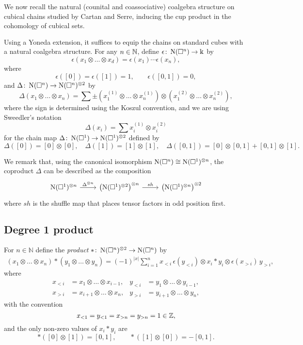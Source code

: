We now recall the natural (counital and coassociative) coalgebra structure on cubical chains studied by Cartan and Serre, inducing the cup product in the cohomology of cubical sets.

Using a Yoneda extension, it suffices to equip the chains on standard cubes with a natural coalgebra structure.
For any $n \in \mathbb{N}$, define $\epsilon \colon \operatorname{N}(\square^n) \to \Bbbk$ by
\[
\epsilon \left( x_1 \otimes \dots \otimes x_d \right) = \epsilon(x_1) \dotsm \epsilon(x_n),
\]
where
\[
\epsilon([0]) = \epsilon([1]) = 1, \qquad \epsilon([0, 1]) = 0,
\]
and $\Delta \colon \operatorname{N}(\square^n) \to \operatorname{N}(\square^n)^{\otimes 2}$ by
\[
\Delta (x_1 \otimes \dots \otimes x_n) =
\sum \pm \left( x_1^{(1)} \otimes \dots \otimes x_n^{(1)} \right) \otimes
\left( x_1^{(2)} \otimes \dots \otimes x_n^{(2)} \right),
\]
where the sign is determined using the Koszul convention, and we are using Sweedler's notation
\[
\Delta(x_i) = \sum x_i^{(1)} \otimes x_i^{(2)}
\]
for the chain map $\Delta \colon \operatorname{N}(\square^1) \to \operatorname{N}(\square^1)^{\otimes 2}$ defined by
\[
\Delta([0]) = [0] \otimes [0], \quad \Delta([1]) = [1] \otimes [1], \quad \Delta([0,1]) = [0] \otimes [0,1] + [0,1] \otimes [1].
\]

We remark that, using the canonical isomorphism $\operatorname{N}(\square^n) \cong \operatorname{N}(\square^1)^{\otimes n}$, the coproduct $\Delta$ can be described as the composition
\[
\begin{tikzcd}
\chains(\cube^1)^{\otimes n} \arrow[r, "\Delta^{\otimes n}"] & \left( \chains(\cube^1)^{\otimes 2} \right)^{\otimes n} \arrow[r, "sh"] & \left( \chains(\cube^1)^{\otimes n} \right)^{\otimes 2}
\end{tikzcd}
\]
where $sh$ is the shuffle map that places tensor factors in odd position first.

\subsection{Degree 1 product}

For $n \in \mathbb{N}$ define the \textit{product} $\ast  \colon \operatorname{N}(\square^n)^{\otimes 2} \to \operatorname{N}(\square^n)$ by
\begin{align*}
(x_1 \otimes \dots \otimes x_n) \ast (y_1 \otimes \dots \otimes y_n) =
(-1)^{|x|} \sum_{i=1}^n x_{<i}\, \epsilon(y_{<i}) \otimes x_i \ast y_i \otimes \epsilon(x_{>i}) \, y_{>i},
\end{align*}
where
\begin{align*}
x_{<i} & = x_1 \otimes \dots \otimes x_{i-1}, &
y_{<i} & = y_1 \otimes \dots \otimes y_{i-1}, \\
x_{>i} & = x_{i+1} \otimes \dots \otimes x_n, &
y_{>i} & = y_{i+1} \otimes \dots \otimes y_n,
\end{align*}
with the convention
\[
x_{<1} = y_{<1} = x_{>n} = y_{>n} = 1 \in \mathbb{Z},
\]
and the only non-zero values of $x_i \ast y_i$ are
\[
\ast([0] \otimes [1]) = [0, 1], \qquad  \ast([1] \otimes [0]) = -[0, 1].
\]

